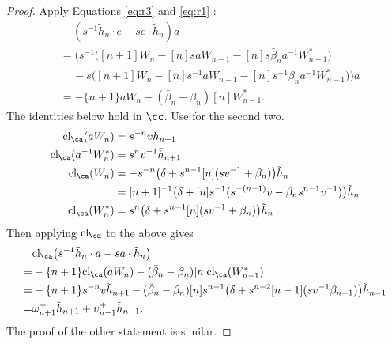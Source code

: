 \begin{proof}
Apply Equations \eqref{eq:r3} and \eqref{eq:r1} :
\begin{align*}
& \quad \, ( s^{-1} \tilde{h}_n \cdot e - s e \cdot \tilde{h}_n ) a \\
&=  \Big( s^{-1} \big( [n+1] W_n - [n] s a W_{n-1} - [n] s \bar{\beta}_n a^{-1} W^*_{n-1} \big) \\
&\quad \, - s \big( [n+1] W_n - [n] s^{-1} a W_{n-1} - [n] s^{-1} \beta_n a^{-1} W^*_{n-1} \big) \Big) a \\
&= - \{n+1\} a W_n - ( \bar{\beta}_n - \beta_n ) [n] W^*_{n-1}.
\end{align*}
The identities below hold in $\cc$. Use \cite[Lemma 21]{She16} for the second two.
\begin{align*}
\textrm{cl}_\ca ( a W_n ) &= s^{-n} v \tilde{h}_{n+1} \\
\textrm{cl}_\ca ( a^{-1} W^*_n ) &= s^n v^{-1} \tilde{h}_{n+1} \\
\textrm{cl}_\ca ( W_n ) &= -s^{-n} \big( \delta + s^{n-1} [n] ( s v^{-1} + \beta_n ) \big) \tilde{h}_n \\
&= [n+1]^{-1} \big( \delta + [n]s^{-1} ( s^{-(n-1)} v - \beta_n s^{n-1} v^{-1} ) \big) \tilde{h}_n \\
\textrm{cl}_\ca ( W^*_n ) &= s^n \big( \delta + s^{n-1} [n] ( s v^{-1} + \beta_n ) \big) \tilde{h}_n
\end{align*}
Then applying $\textrm{cl}_\ca$ to the above gives
\begin{align*} 
& \textrm{cl}_\ca \big( s^{-1} \tilde{h}_n \cdot a - s a \cdot \tilde{h}_n \big) \\
=& - \{n+1\} \textrm{cl}_\ca ( a W_n ) - ( \bar{\beta}_n - \beta_n ) [n] \textrm{cl}_\ca ( W^*_{n-1} ) \\
= & - \{n+1\} s^{-n} v \tilde{h}_{n+1} - ( \bar{\beta}_n - \beta_n ) [n] s^{n-1} \big( \delta + s^{n-2} [n-1] ( s v^{-1} \beta_{n-1} ) \big) \tilde{h}_{n-1} \\
= & \omega_{n+1}^+ \tilde{h}_{n+1} + \upsilon_{n-1}^+ \tilde{h}_{n-1}.
\end{align*}
The proof of the other statement is similar. 
\end{proof}

